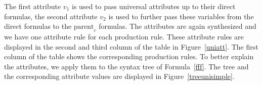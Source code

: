The first attribute $v_1$ is used to pass universal attributes up to their direct formulas, the second attribute $v_2$ is used to further pass these variables from the direct formulas
to the $\text{parent}_c$ formulas. The attributes are again synthesized and we have one attribute rule for each production rule. These attribute rules are displayed in the second and third 
column of the table in Figure~\ref{uniatt}. The first column of the table shows the corresponding production rules. To better explain the attributes, 
we apply them to the syntax tree
of Formula~\ref{fff}. The tree and the corresponding attribute values are displayed in Figure~\ref{treeunisimple}.




